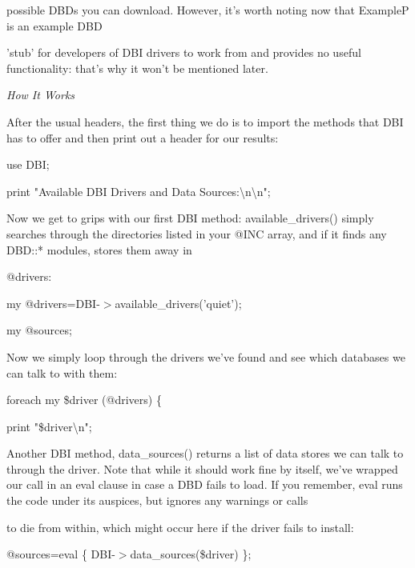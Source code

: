 \documentclass[a4paper,11pt]{book}
\begin{document}
\noindent possible DBDs you can download. However, it's worth noting now that ExampleP is an example DBD

\noindent 'stub' for developers of DBI drivers to work from and provides no useful functionality: that's why it won't be mentioned later.

\noindent 

\noindent \textit{How It Works}

\noindent After the usual headers, the first thing we do is to import the methods that DBI has to offer and then print out a header for our results:

\noindent 

\noindent use DBI;

\noindent 

\noindent print "Available DBI Drivers and Data Sources:\textbackslash n\textbackslash n";

\noindent 

\noindent Now we get to grips with our first DBI method: available\_drivers() simply searches through the directories listed in your @INC array, and if it finds any DBD::* modules, stores them away in

\noindent @drivers:

\noindent 

\noindent my @drivers=DBI-$>$available\_drivers('quiet');

\noindent my @sources;

\noindent 

\noindent 

\noindent Now we simply loop through the drivers we've found and see which databases we can talk to with them:

\noindent 

\noindent foreach my \$driver (@drivers) \{

\noindent print "\$driver\textbackslash n";

\noindent 

\noindent Another DBI method, data\_sources() returns a list of data stores we can talk to through the driver. Note that while it should work fine by itself, we've wrapped our call in an eval clause in case a DBD fails to load. If you remember, eval runs the code under its auspices, but ignores any warnings or calls

\noindent to die from within, which might occur here if the driver fails to install:

\noindent 

\noindent @sources=eval \{ DBI-$>$data\_sources(\$driver) \};
\end{document}
